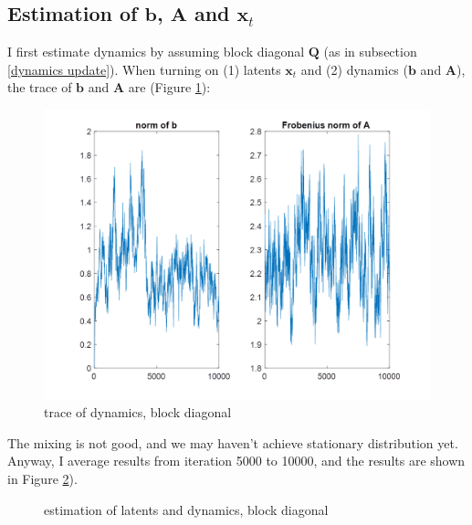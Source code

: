 \documentclass[]{article}
\begin{document}
\subsection{Estimation of \(\mathbf{b}\), \(\mathbf{A}\) and \(\mathbf{x}_t\)}
I first estimate dynamics by assuming block diagonal \(\mathbf{Q}\) (as in subsection \ref{dynamics update}). When turning on (1) latents \(\mathbf{x}_t\) and (2) dynamics (\(\mathbf{b}\) and \(\mathbf{A}\)), the trace of \(\mathbf{b}\) and \(\mathbf{A}\) are (Figure \ref{trace of dynamics, blk}):\\
\begin{figure}[h!]
	\centering
	\includegraphics[width = .7\textwidth]{image022.png}
	\caption{trace of dynamics, block diagonal}
	\label{trace of dynamics, blk}
\end{figure}

The mixing is not good, and we may haven't achieve stationary distribution yet. Anyway, I average results from iteration 5000 to 10000, and the results are shown in Figure \ref{lat and dyn, blk}).
\begin{figure}[h!]
	\caption{estimation of latents and dynamics, block diagonal}
	\label{lat and dyn, blk}
\end{figure}
\end{document}
